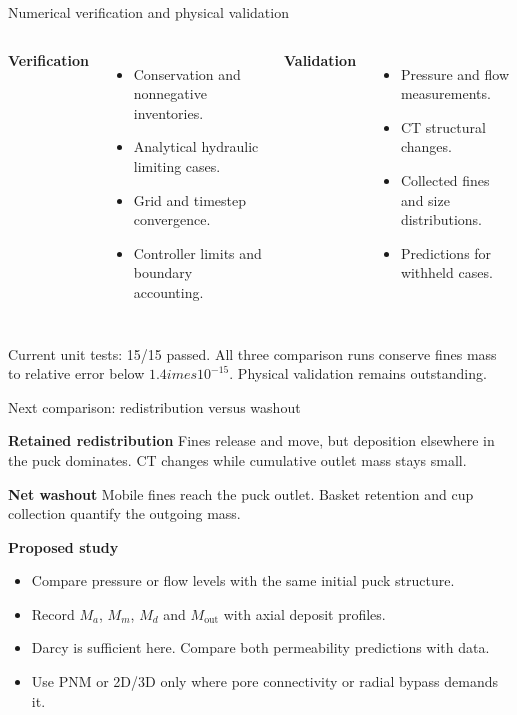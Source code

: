 \documentclass[aspectratio=169,11pt]{beamer}
\newcommand{\hi}[1]{\textcolor{tumblue}{\textbf{#1}}}
\begin{document}
\begin{frame}{Numerical verification and physical validation}
\small

\begin{columns}[T,onlytextwidth]
\hi{Verification}
\begin{itemize}
\item Conservation and nonnegative inventories.
\item Analytical hydraulic limiting cases.
\item Grid and timestep convergence.
\item Controller limits and boundary accounting.
\end{itemize}
\hi{Validation}
\begin{itemize}
\item Pressure and flow measurements.
\item CT structural changes.
\item Collected fines and size distributions.
\item Predictions for withheld cases.
\end{itemize}
\end{columns}
\vfill
\small Current unit tests: 15/15 passed. All three comparison runs conserve fines mass to relative error below $1.4	imes10^{-15}$. Physical validation remains outstanding.

\end{frame}

\begin{frame}{Next comparison: redistribution versus washout}
\small

\hi{Retained redistribution}
\small Fines release and move, but deposition elsewhere in the puck dominates. CT changes while cumulative outlet mass stays small.
\par\medskip
\hi{Net washout}
\small Mobile fines reach the puck outlet. Basket retention and cup collection quantify the outgoing mass.
\par\medskip
\hi{Proposed study}
\begin{itemize}
\item Compare pressure or flow levels with the same initial puck structure.
\item Record $M_a$, $M_m$, $M_d$ and $M_{\mathrm{out}}$ with axial deposit profiles.
\item Darcy is sufficient here. Compare both permeability predictions with data.
\item Use PNM or 2D/3D only where pore connectivity or radial bypass demands it.
\end{itemize}

\end{frame}
\end{document}
